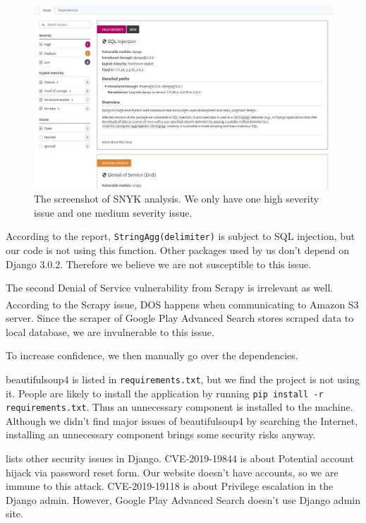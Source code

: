 \documentclass[12pt, a4paper]{article}
\newcommand{\code}[1]{\texttt{#1}}
\begin{document}
\begin{figure}[ht]
\centering
\includegraphics[width=\textwidth]{snyk.JPG}
\caption{The screenshot of SNYK analysis. We only have one high severity issue and one medium severity issue.}
\label{fig:snyk}
\end{figure}

According to the report, \code{StringAgg(delimiter)} is subject to SQL injection, but our code is not using this function. Other packages used by us don't depend on Django 3.0.2. Therefore we believe we are not susceptible to this issue.

The second Denial of Service vulnerability from Scrapy is irrelevant as well. According to the Scrapy issue\textsuperscript{\cite{scrapy-s3}}, DOS happens when communicating to Amazon S3 server. Since the scraper of Google Play Advanced Search stores scraped data to local database, we are invulnerable to this issue.

To increase confidence, we then manually go over the dependencies.

beautifulsoup4 is listed in \code{requirements.txt}, but we find the project is not using it. People are likely to install the application by running \code{pip install -r requirements.txt}. Thus an unnecessary component is installed to the machine. Although we didn't find major issues of beautifulsoup4 by searching the Internet, installing an unnecessary component brings some security risks anyway.


\cite{django-security-issues} lists other security issues in Django. CVE-2019-19844 is about Potential account hijack via password reset form. Our website doesn't have accounts, so we are immune to this attack. CVE-2019-19118 is about Privilege escalation in the Django admin. However, Google Play Advanced Search doesn't use Django admin site.
\end{document}
